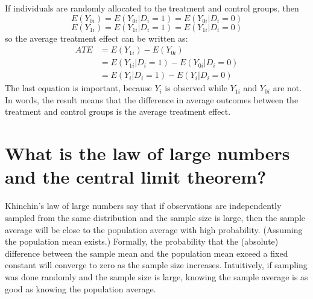 \documentclass[%
 aip,
 jmp,%
 amsmath,amssymb,
 reprint,%
]{revtex4-1}
\begin{document}
If individuals are randomly allocated to the treatment and control groups, then
$$E(Y_{0i}) = E(Y_{0i}|D_i = 1) = E(Y_{0i}|D_i = 0)$$
$$E(Y_{1i}) = E(Y_{1i}|D_i = 1) = E(Y_{1i}|D_i = 0)$$
so the average treatment effect can be written as:
\begin{align*}
ATE &= E(Y_{1i}) - E(Y_{0i}) \\
    &= E(Y_{1i}|D_i = 1) - E(Y_{0i}|D_i = 0) \\
    &= E(Y_i|D_i = 1) - E(Y_i|D_i = 0)
\end{align*}
The last equation is important, because $Y_i$ is observed while $Y_{1i}$ and $Y_{0i}$ are not.\\

In words, the result means that the difference in average outcomes between the treatment
and control groups is the average treatment effect.\\








\section*{What is the law of large numbers and the central limit theorem?}

Khinchin's law of large numbers say that if observations are independently
sampled from the same distribution and the sample size is large, then the sample average
will be close to the population average with high probability. (Assuming the population mean
exists.) Formally, the probability that the (absolute) difference between the sample mean and
the population mean exceed a fixed constant will converge to zero as the sample size increases.
Intuitively, if sampling was done randomly and the sample size is large, knowing the sample
average is as good as knowing the population average.\\
\end{document}
